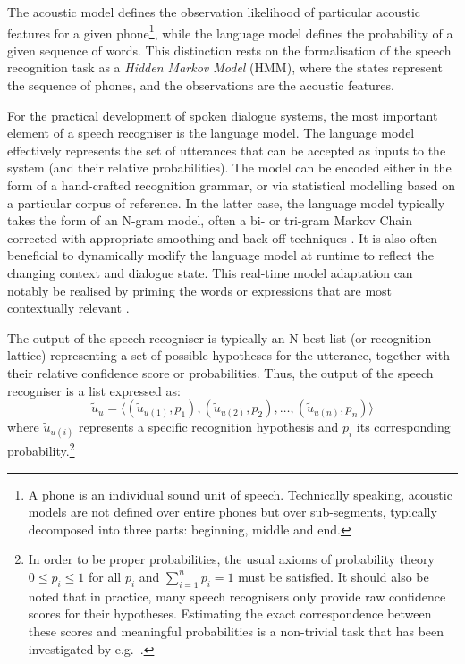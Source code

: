 The acoustic model defines the observation likelihood of particular acoustic features for a given phone\footnote{A phone is an individual sound unit of speech.  Technically speaking, acoustic models are not defined over entire phones but over sub-segments, typically decomposed into three parts: beginning, middle and end.}, while the language model defines the probability of a given sequence of words. This distinction rests on the formalisation of the speech recognition task as a \textit{Hidden Markov Model} (HMM), where the states represent the sequence of phones, and the observations are the acoustic features.  


For the practical development of spoken dialogue systems, the most important element of a speech recogniser is the language model.  The language model effectively represents the set of utterances that can be accepted as inputs to the system (and their relative probabilities).  The model can be encoded either in the form of a hand-crafted recognition grammar, or via statistical modelling based on a particular corpus of reference.  In the latter case, the language model typically takes the form of an N-gram model, often a bi- or tri-gram Markov Chain corrected with appropriate smoothing and back-off techniques  \citep{Jelinek:1998,ChenG99}.  It is also often beneficial to dynamically modify the language model at runtime to reflect the changing context and dialogue state.  This real-time model adaptation can notably be realised by priming the words or expressions that are most contextually relevant \citep{gruenstein2005context,ESSLLI2008-springerreprint}.

The output of the speech recogniser is typically an N-best list (or recognition lattice) representing a set of possible hypotheses for the utterance, together with their relative confidence score or probabilities.  Thus, the output of the speech recogniser is a list expressed as: 
\begin{equation*}
\tilde{u}_u = \langle (\tilde{u}_{u(1)}, p_{1}), (\tilde{u}_{u(2)}, p_{2}), \dots, (\tilde{u}_{u(n)}, p_{n})\rangle
\end{equation*}
where $\tilde{u}_{u(i)}$ represents a specific recognition hypothesis and $p_{i}$ its corresponding probability.\footnote{In order to be proper probabilities,  the usual axioms of probability theory $0 \leq p_{i} \leq 1$ for all $p_{i}$ and $\sum_{i=1}^n p_{i} = 1$ must be satisfied.   It should also be noted that in practice, many speech recognisers only provide raw confidence scores for their hypotheses.  Estimating the exact correspondence between these scores and meaningful probabilities is a non-trivial task that has been investigated by e.g.\ \cite{Williams08}.} 

